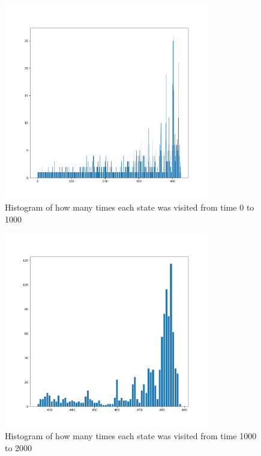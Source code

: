 \documentclass[letterpaper, reqno,11pt]{article}
\begin{document}
\begin{figure}[htpb]
    \centering
    \includegraphics[width=0.8\textwidth]{q6b}
    \caption{Histogram of how many times each state was visited from time 0 to 1000}
    \label{fig:q6b}
\end{figure}

\begin{figure}[htpb]
    \centering
    \includegraphics[width=0.8\textwidth]{q6c}
    \caption{Histogram of how many times each state was visited from time 1000 to 2000}
    \label{fig:q6c}
\end{figure}
\end{document}
